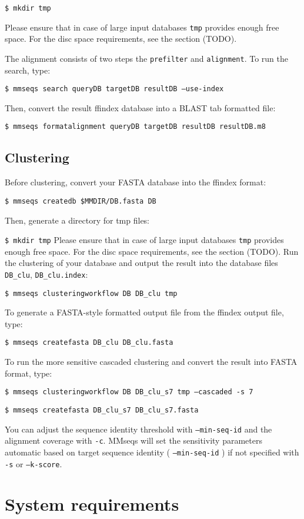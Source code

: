 \documentclass[11pt,a4paper]{report}
\begin{document}
\texttt{\$ mkdir tmp}

Please ensure that in case of large input databases \texttt{tmp} provides
enough free space. For the disc space requirements, see the section (TODO).

The alignment consists of two steps the \texttt{prefilter} and \texttt{alignment}.
To run the search, type:

\texttt{\$ mmseqs search queryDB targetDB resultDB --use-index}

Then, convert the result ffindex database into a BLAST tab formatted file:

\texttt{\$ mmseqs formatalignment queryDB targetDB resultDB resultDB.m8}


\subsection*{Clustering}

Before clustering, convert your FASTA database into the ffindex format:

\texttt{\$ mmseqs createdb \$MMDIR/DB.fasta DB}

Then, generate a directory for tmp files:

\texttt{\$ mkdir tmp}
Please ensure that in case of large input databases \texttt{tmp} provides
enough free space. For the disc space requirements, see the section (TODO).
Run the clustering of your database and output the result
into the database files \texttt{DB\_clu}, \texttt{DB\_clu.index}:

\texttt{\$ mmseqs clusteringworkflow DB DB\_clu tmp}

To generate a FASTA-style formatted output file from the ffindex output
file, type:

\texttt{\$ mmseqs createfasta DB\_clu DB\_clu.fasta}

To run the more sensitive cascaded clustering and convert the result
into FASTA format, type:

\texttt{\$ mmseqs clusteringworkflow DB DB\_clu\_s7 tmp --cascaded -s 7}

\texttt{\$ mmseqs createfasta DB\_clu\_s7 DB\_clu\_s7.fasta}

You can adjust the sequence identity threshold with \texttt{--min-seq-id} and the alignment coverage with \texttt{-c}.
MMseqs will set the sensitivity parameters automatic based on target sequence identity (  \texttt{--min-seq-id} ) if not specified with \texttt{-s} or \texttt{--k-score}.


\section{System requirements}
\end{document}
